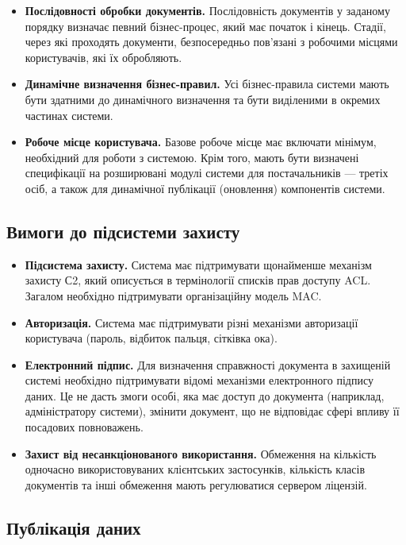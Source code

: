 \documentclass{memoir}
\begin{document}
\begin{itemize}
    \item \textbf{Послідовності обробки документів.} Послідовність документів у заданому порядку визначає певний бізнес-процес, який має початок і кінець. Стадії, через які проходять документи, безпосередньо пов’язані з робочими місцями користувачів, які їх обробляють.
    \item \textbf{Динамічне визначення бізнес-правил.} Усі бізнес-правила системи мають бути здатними до динамічного визначення та бути виділеними в окремих частинах системи.
    \item \textbf{Робоче місце користувача.} Базове робоче місце має включати мінімум, необхідний для роботи з системою. Крім того, мають бути визначені специфікації на розширювані модулі системи для постачальників — третіх осіб, а також для динамічної публікації (оновлення) компонентів системи.
\end{itemize}

\subsection{Вимоги до підсистеми захисту}

\begin{itemize}
    \item \textbf{Підсистема захисту.} Система має підтримувати щонайменше механізм захисту С2, який описується в термінології списків прав доступу ACL. Загалом необхідно підтримувати організаційну модель MAC.
    \item \textbf{Авторизація.} Система має підтримувати різні механізми авторизації користувача (пароль, відбиток пальця, сітківка ока).
    \item \textbf{Електронний підпис.} Для визначення справжності документа в захищеній системі необхідно підтримувати відомі механізми електронного підпису даних. Це не дасть змоги особі, яка має доступ до документа (наприклад, адміністратору системи), змінити документ, що не відповідає сфері впливу її посадових повноважень.
    \item \textbf{Захист від несанкціонованого використання.} Обмеження на кількість одночасно використовуваних клієнтських застосунків, кількість класів документів та інші обмеження мають регулюватися сервером ліцензій.
\end{itemize}

\subsection{Публікація даних}
\end{document}
